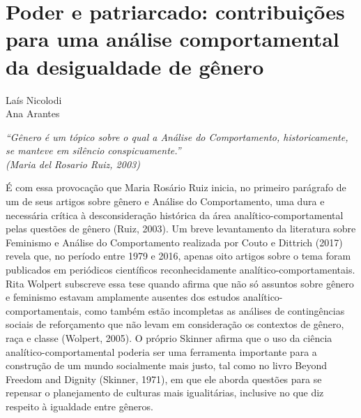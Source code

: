 \setcounter{footnote}{0}
\setcounter{figure}{0}
\setcounter{table}{0}
\chapter*{Poder e patriarcado: contribuições para uma análise comportamental da desigualdade de gênero}
\begin{flushright}
\begin{small}
Laís Nicolodi\\
Ana Arantes\\
\end{small}
\vspace{1cm}

\emph{``Gênero é um tópico sobre o qual a Análise do Comportamento, historicamente, se manteve em silêncio conspicuamente.''\\ (Maria del Rosario Ruiz, 2003)}
\end{flushright}

É com essa provocação que Maria Rosário Ruiz inicia, no primeiro parágrafo de um de seus artigos sobre gênero e Análise do Comportamento, uma dura e necessária crítica à desconsideração histórica da área analítico-comportamental pelas questões de gênero (Ruiz, 2003). Um breve levantamento da literatura sobre Feminismo e Análise do Comportamento realizada por Couto e Dittrich (2017) revela que, no período entre 1979 e 2016, apenas oito artigos sobre o tema foram publicados em periódicos científicos reconhecidamente analítico-compor\-tamentais. Rita Wolpert subscreve essa tese quando afirma que não só assuntos sobre gênero e feminismo estavam amplamente ausentes dos estudos analítico-comportamentais, como também estão incompletas as análises de contingências sociais de reforçamento que não levam em consideração os contextos de gênero, raça e classe (Wolpert, 2005). O próprio Skinner afirma que o uso da ciência analítico-comportamental poderia ser uma ferramenta importante para a construção de um mundo socialmente mais justo, tal como no livro Beyond Freedom and Dignity (Skinner, 1971), em que ele aborda questões para se repensar o planejamento de culturas mais igualitárias, inclusive no que diz respeito à igualdade entre gêneros.


